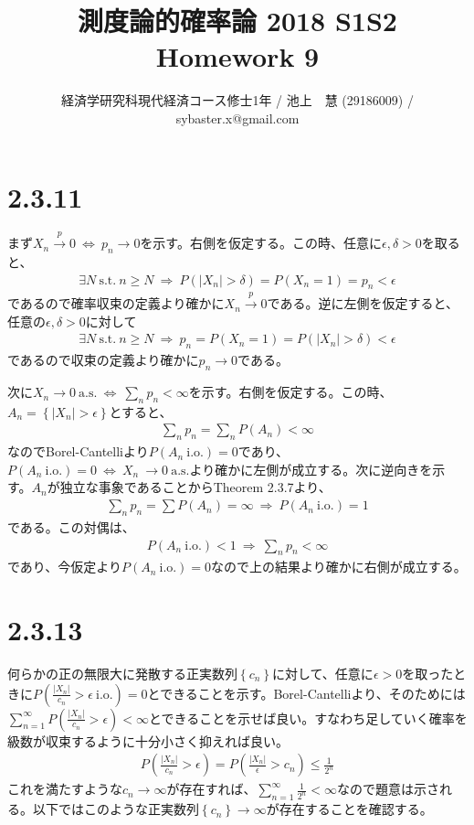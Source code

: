 \documentclass{article}
\begin{document}
\title{測度論的確率論 2018 S1S2 \\ 
Homework 9}
\author{経済学研究科現代経済コース修士1年 / 池上　慧 (29186009) / sybaster.x@gmail.com}
\maketitle

\section{2.3.11}
まず$X_n \xrightarrow{p} 0\ \Leftrightarrow\ p_n \to 0$を示す。右側を仮定する。この時、任意に$\epsilon, \delta > 0$を取ると、
\begin{align*}
	\exists N\ \text{s.t.}\ n\geq N\ \Rightarrow\ P\left( |X_n| > \delta \right) = P(X_n = 1) = p_n < \epsilon
\end{align*}
であるので確率収束の定義より確かに$X_n \xrightarrow{p} 0$である。逆に左側を仮定すると、任意の$\epsilon, \delta > 0$に対して
\begin{align*}
	\exists N\ \text{s.t.}\ n\geq N\ \Rightarrow\ p_n = P(X_n = 1) = P(|X_n| > \delta) < \epsilon
\end{align*}
であるので収束の定義より確かに$p_n \to 0$である。

次に$X_n \to 0\ \text{a.s.}\ \Leftrightarrow\ \sum_n p_n < \infty$を示す。右側を仮定する。この時、$A_n = \left\{ |X_n| > \epsilon \right\}$とすると、
\begin{align*}
	\sum_n p_n = \sum_n P(A_n) < \infty
\end{align*}
なのでBorel-Cantelliより$P(A_n\ \text{i.o.}) = 0$であり、$P(A_n\ \text{i.o.}) = 0\ \Leftrightarrow\ X_n\ \to 0 \ \text{a.s.}$より確かに左側が成立する。次に逆向きを示す。$A_n$が独立な事象であることからTheorem 2.3.7より、
\begin{align*}
	\sum_n p_n = \sum P(A_n) = \infty\ \Rightarrow\ P(A_n\ \text{i.o.}) = 1
\end{align*}
である。この対偶は、
\begin{align*}
	P(A_n\ \text{i.o.}) < 1\ \Rightarrow\ \sum_n p_n < \infty
\end{align*}
であり、今仮定より$P(A_n\ \text{i.o.}) = 0$なので上の結果より確かに右側が成立する。

\section{2.3.13}
何らかの正の無限大に発散する正実数列$\left\{ c_n \right\}$に対して、任意に$\epsilon > 0$を取ったときに$P\left( \frac{|X_n|}{c_n} > \epsilon\ \text{i.o.} \right) = 0$とできることを示す。Borel-Cantelliより、そのためには$\sum_{n=1}^{\infty} P\left( \frac{|X_n|}{c_n} > \epsilon \right) < \infty$とできることを示せば良い。すなわち足していく確率を級数が収束するように十分小さく抑えれば良い。
\begin{align}
	P\left( \frac{|X_n|}{c_n} > \epsilon \right) = P\left( \frac{|X_n|}{\epsilon} > c_n \right) \leq \frac{1}{2^n}
\end{align}
これを満たすような$c_n\to \infty$が存在すれば、$\sum_{n=1}^{\infty} \frac{1}{2^n} < \infty$なので題意は示される。以下ではこのような正実数列$\left\{ c_n \right\}\to \infty$が存在することを確認する。
\end{document}
